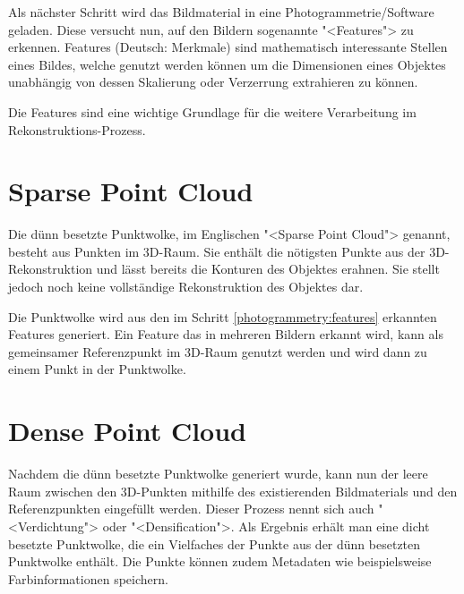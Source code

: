 Als nächster Schritt wird das Bildmaterial in eine Photogrammetrie\-/Software
geladen. Diese versucht nun, auf den Bildern sogenannte "<Features"> zu
erkennen. Features (Deutsch: Merkmale) sind mathematisch interessante Stellen
eines Bildes, welche genutzt werden können um die Dimensionen eines Objektes
unabhängig von dessen Skalierung oder Verzerrung extrahieren zu können.

Die Features sind eine wichtige Grundlage für die weitere Verarbeitung im
Rekonstruktions-Prozess.


\section{Sparse Point Cloud}

\label{photogrammetry:sparse-point-cloud}

Die dünn besetzte Punktwolke, im Englischen "<Sparse Point Cloud"> genannt,
besteht aus Punkten im 3D-Raum. Sie enthält die nötigsten Punkte aus der
3D-Rekonstruktion und lässt bereits die Konturen des Objektes erahnen. Sie
stellt jedoch noch keine vollständige Rekonstruktion des Objektes dar.

Die Punktwolke wird aus den im Schritt \ref{photogrammetry:features} erkannten
Features generiert. Ein Feature das in mehreren Bildern erkannt wird, kann als
gemeinsamer Referenzpunkt im 3D-Raum genutzt werden und wird dann zu einem Punkt
in der Punktwolke.


\section{Dense Point Cloud}

\label{photogrammetry:dense-point-cloud}

Nachdem die dünn besetzte Punktwolke generiert wurde, kann nun der leere Raum
zwischen den 3D-Punkten mithilfe des existierenden Bildmaterials und den
Referenzpunkten eingefüllt werden. Dieser Prozess nennt sich auch
"<Verdichtung"> oder "<Densification">. Als Ergebnis erhält man eine dicht
besetzte Punktwolke, die ein Vielfaches der Punkte aus der dünn besetzten
Punktwolke enthält. Die Punkte können zudem Metadaten wie beispielsweise
Farbinformationen speichern.


